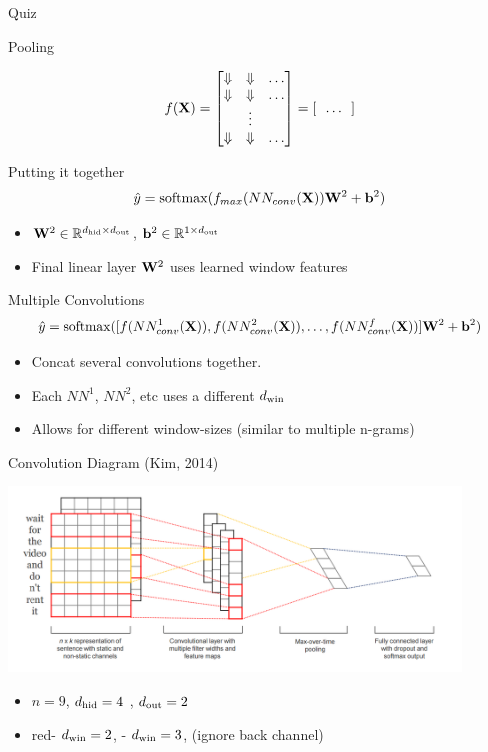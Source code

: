 \documentclass{beamer}
\begin{document}
\begin{frame}{Quiz}
\begin{itemize}
\begin{frame}{Pooling}
\begin{itemize}
  \end{itemize}

  \[f(\mathbf{X}) =  \begin{bmatrix}\Downarrow & \Downarrow  & \ldots \\   
    \Downarrow & \Downarrow & \ldots\\
    & \vdots \\ 
    \Downarrow &\Downarrow & \ldots \\
  \end{bmatrix} = [ \ \ \ldots \ \ ]  \]

  
\end{frame}

\begin{frame}{Putting it together}
  \[ \hat{y} = \softmax( f_{max}(NN_{conv}(\boldX)) \boldW^2 + \boldb^2 ) \]
  \begin{itemize}
  \item $\mathbf{W}^2 \in \mathbb{R}^{{d_{\mathrm{hid}}} \times {d_{\mathrm{out}}}}$, $\mathbf{b}^2 \in \mathbb{R}^{1 \times {d_{\mathrm{out}}}}$
    \air 
  \item Final linear layer $\mathbf{W}^2$ uses learned window features
  \end{itemize}
\end{frame}

\begin{frame}{Multiple Convolutions}
  \[ \hat{y} = \softmax([ f(NN^1_{conv}(\boldX)), f(NN^2_{conv}(\boldX)), \ldots, f(NN^f_{conv}(\boldX)) ]  \boldW^2 + \boldb^2 ) \]
  \begin{itemize}
  \item Concat several convolutions together. 
    \air 
  \item Each $NN^1$, $NN^2$, etc uses a different ${d_{\mathrm{win}}}$  
    \air
  \item Allows for different window-sizes (similar to multiple n-grams) 
  \end{itemize}
\end{frame}



\begin{frame}{Convolution Diagram (Kim, 2014)}
  \begin{center}
    \includegraphics[width=12cm]{kimdiagram}
  \end{center}
  \begin{itemize}
  \item $n = 9$, ${d_{\mathrm{hid}}}=4$ , ${d_{\mathrm{out}}}=2$  
    \air 
  \item \alert{red}- ${d_{\mathrm{win}}} =2$, - ${d_{\mathrm{win}}} =3$, (ignore back channel) 
    \air 


\end{itemize}
\end{frame}
\end{itemize}
\end{frame}
\end{document}
